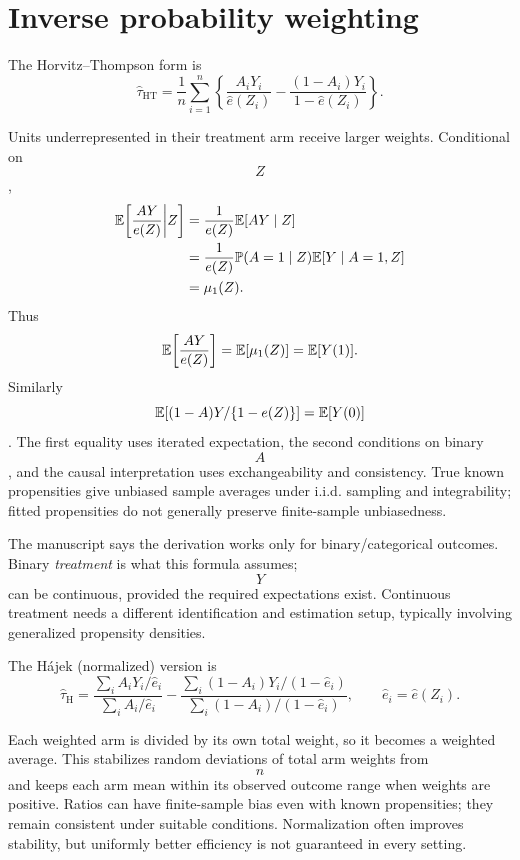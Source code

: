 \section{Inverse probability weighting}
The Horvitz--Thompson form is
\begin{equation}
\widehat\tau_{\mathrm{HT}}=\frac1n\sum_{i=1}^n
\left\{\frac{A_iY_i}{\widehat e(Z_i)}-
\frac{(1-A_i)Y_i}{1-\widehat e(Z_i)}\right\}.
\end{equation}
\begin{todo}
Units underrepresented in their treatment arm receive larger weights. Conditional on $$Z$$,
\begin{align}
\mathbb E\!\left[\frac{AY}{e(Z)}\middle|Z\right]
&=\frac1{e(Z)}\mathbb E[AY\mid Z]\\
&=\frac1{e(Z)}\mathbb P(A=1\mid Z)\mathbb E[Y\mid A=1,Z]\\
&=\mu_1(Z).
\end{align}
Thus
\begin{equation}
\mathbb E\!\left[\frac{AY}{e(Z)}\right]=\mathbb E[\mu_1(Z)]=\mathbb E[Y(1)].
\end{equation}
Similarly $$\mathbb E[(1-A)Y/\{1-e(Z)\}]=\mathbb E[Y(0)]$$. The first equality uses iterated expectation, the second conditions on binary $$A$$, and the causal interpretation uses exchangeability and consistency. True known propensities give unbiased sample averages under i.i.d. sampling and integrability; fitted propensities do not generally preserve finite-sample unbiasedness.
\end{todo}
\begin{correction}
The manuscript says the derivation works only for binary/categorical outcomes. Binary \emph{treatment} is what this formula assumes; $$Y$$ can be continuous, provided the required expectations exist. Continuous treatment needs a different identification and estimation setup, typically involving generalized propensity densities.
\end{correction}

The H\'ajek (normalized) version is
\begin{equation}
\widehat\tau_{\mathrm H}=
\frac{\sum_i A_iY_i/\widehat e_i}{\sum_i A_i/\widehat e_i}
-\frac{\sum_i(1-A_i)Y_i/(1-\widehat e_i)}{\sum_i(1-A_i)/(1-\widehat e_i)},
\qquad\widehat e_i=\widehat e(Z_i).
\end{equation}
\begin{todo}
Each weighted arm is divided by its own total weight, so it becomes a weighted average. This stabilizes random deviations of total arm weights from $$n$$ and keeps each arm mean within its observed outcome range when weights are positive. Ratios can have finite-sample bias even with known propensities; they remain consistent under suitable conditions. Normalization often improves stability, but uniformly better efficiency is not guaranteed in every setting.
\end{todo}

